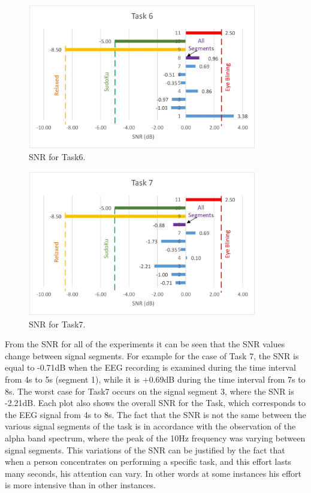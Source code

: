 \begin{figure}[hbt!]
	\centering
	\includegraphics[width=10cm]{Figures/SNRtask6.jpg} 
	\caption{SNR for Task6.} 
	\label{SNR6} 
\end{figure}


\begin{figure}[hbt!]
	\centering
	\includegraphics[width=10cm]{Figures/SNRtask7.jpg} 
	\caption{SNR for Task7.} 
	\label{SNR7} 
\end{figure}

From the SNR for all of the experiments it can be seen that the SNR values change between signal segments. For example for the case of Task 7, the SNR is equal to -0.71dB when the EEG recording is examined during the time interval from 4s to 5s (segment 1), while it is +0.69dB during the time interval from 7s to 8s. The worst case for Task7 occurs on the signal segment 3, where the SNR is -2.21dB. Each plot also shows the overall SNR for the Task, which corresponds to the EEG signal from 4s to 8s. The fact that the SNR is not the same between the various signal segments of the task is in accordance with the observation of the alpha band spectrum, where the peak of the 10Hz frequency was varying between signal segments. This variations of the SNR can be justified by the fact that when a person concentrates on performing a specific task, and this effort lasts many seconds, his attention can vary. In other words at some instances his effort is more intensive than in other instances. 

